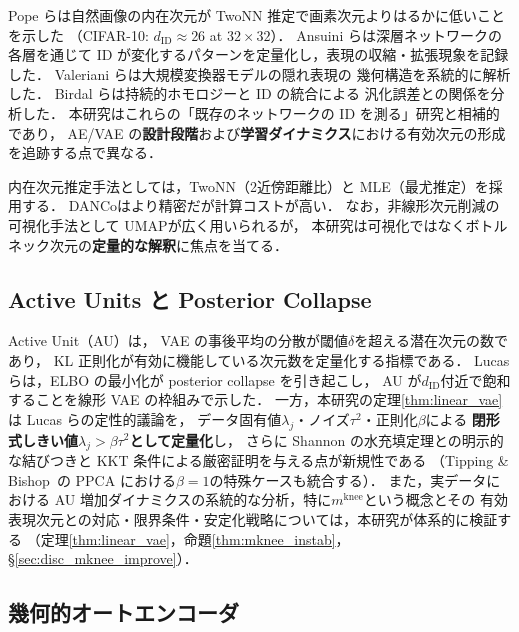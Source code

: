 \documentclass[11pt,a4paper]{jsarticle}
\newcommand{\mknee}{m^{\mathrm{knee}}}
\begin{document}
Pope ら\cite{pope2021intrinsic}は自然画像の内在次元が
TwoNN 推定で画素次元よりはるかに低いことを示した
（CIFAR-10: $d_\mathrm{ID} \approx 26$ at $32 \times 32$）．
Ansuini ら\cite{ansuini2019intrinsic}は深層ネットワークの各層を通じて
ID が変化するパターンを定量化し，表現の収縮・拡張現象を記録した．
Valeriani ら\cite{valeriani2023geometry}は大規模変換器モデルの隠れ表現の
幾何構造を系統的に解析した．
Birdal ら\cite{birdal2021intrinsic}は持続的ホモロジーと ID の統合による
汎化誤差との関係を分析した．
本研究はこれらの「既存のネットワークの ID を測る」研究と相補的であり，
AE/VAE の\textbf{設計段階}および\textbf{学習ダイナミクス}における有効次元の形成を追跡する点で異なる．

内在次元推定手法としては，TwoNN\cite{facco2017twonn}（2近傍距離比）と
MLE\cite{levina2005mle}（最尤推定）を採用する．
DANCo\cite{ceruti2014danco}はより精密だが計算コストが高い．
なお，非線形次元削減の可視化手法として UMAP\cite{mcinnes2018umap}が広く用いられるが，
本研究は可視化ではなくボトルネック次元の\textbf{定量的な解釈}に焦点を当てる．

\subsection{Active Units と Posterior Collapse}\label{sec:related_au}

Active Unit（AU）\cite{lucas2019elbo,higgins2017betavae}は，
VAE の事後平均の分散が閾値$\delta$を超える潜在次元の数であり，
KL 正則化が有効に機能している次元数を定量化する指標である．
Lucas ら\cite{lucas2019elbo}は，ELBO の最小化が posterior collapse を引き起こし，
AU が$d_{\mathrm{ID}}$付近で飽和することを線形 VAE の枠組みで示した．
一方，本研究の定理\ref{thm:linear_vae}は Lucas らの定性的議論を，
データ固有値$\lambda_j$・ノイズ$\tau^2$・正則化$\beta$による
\textbf{閉形式しきい値$\lambda_j > \beta\tau^2$として定量化}し，
さらに Shannon の水充填定理との明示的な結びつきと KKT 条件による厳密証明を与える点が新規性である
（Tipping \& Bishop~\cite{tippingbishop1999ppca}の PPCA における$\beta=1$の特殊ケースも統合する）．
また，実データにおける AU 増加ダイナミクスの系統的な分析，特に$\mknee$という概念とその
有効表現次元との対応・限界条件・安定化戦略については，本研究が体系的に検証する
（定理\ref{thm:linear_vae}，命題\ref{thm:mknee_instab}，§\ref{sec:disc_mknee_improve}）．

\subsection{幾何的オートエンコーダ}\label{sec:related_geo}
\end{document}
